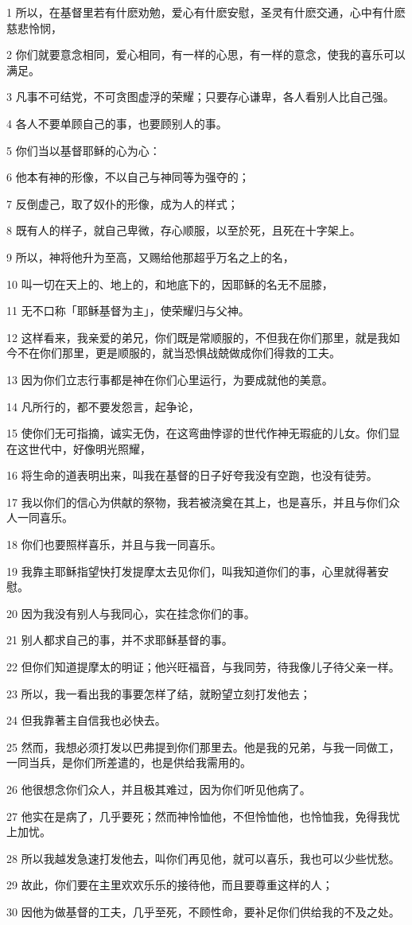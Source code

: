 \par 1 所以，在基督里若有什麽劝勉，爱心有什麽安慰，圣灵有什麽交通，心中有什麽慈悲怜悯，
\par 2 你们就要意念相同，爱心相同，有一样的心思，有一样的意念，使我的喜乐可以满足。
\par 3 凡事不可结党，不可贪图虚浮的荣耀；只要存心谦卑，各人看别人比自己强。
\par 4 各人不要单顾自己的事，也要顾别人的事。
\par 5 你们当以基督耶稣的心为心：
\par 6 他本有神的形像，不以自己与神同等为强夺的；
\par 7 反倒虚己，取了奴仆的形像，成为人的样式；
\par 8 既有人的样子，就自己卑微，存心顺服，以至於死，且死在十字架上。
\par 9 所以，神将他升为至高，又赐给他那超乎万名之上的名，
\par 10 叫一切在天上的、地上的，和地底下的，因耶稣的名无不屈膝，
\par 11 无不口称「耶稣基督为主」，使荣耀归与父神。
\par 12 这样看来，我亲爱的弟兄，你们既是常顺服的，不但我在你们那里，就是我如今不在你们那里，更是顺服的，就当恐惧战兢做成你们得救的工夫。
\par 13 因为你们立志行事都是神在你们心里运行，为要成就他的美意。
\par 14 凡所行的，都不要发怨言，起争论，
\par 15 使你们无可指摘，诚实无伪，在这弯曲悖谬的世代作神无瑕疵的儿女。你们显在这世代中，好像明光照耀，
\par 16 将生命的道表明出来，叫我在基督的日子好夸我没有空跑，也没有徒劳。
\par 17 我以你们的信心为供献的祭物，我若被浇奠在其上，也是喜乐，并且与你们众人一同喜乐。
\par 18 你们也要照样喜乐，并且与我一同喜乐。
\par 19 我靠主耶稣指望快打发提摩太去见你们，叫我知道你们的事，心里就得著安慰。
\par 20 因为我没有别人与我同心，实在挂念你们的事。
\par 21 别人都求自己的事，并不求耶稣基督的事。
\par 22 但你们知道提摩太的明证；他兴旺福音，与我同劳，待我像儿子待父亲一样。
\par 23 所以，我一看出我的事要怎样了结，就盼望立刻打发他去；
\par 24 但我靠著主自信我也必快去。
\par 25 然而，我想必须打发以巴弗提到你们那里去。他是我的兄弟，与我一同做工，一同当兵，是你们所差遣的，也是供给我需用的。
\par 26 他很想念你们众人，并且极其难过，因为你们听见他病了。
\par 27 他实在是病了，几乎要死；然而神怜恤他，不但怜恤他，也怜恤我，免得我忧上加忧。
\par 28 所以我越发急速打发他去，叫你们再见他，就可以喜乐，我也可以少些忧愁。
\par 29 故此，你们要在主里欢欢乐乐的接待他，而且要尊重这样的人；
\par 30 因他为做基督的工夫，几乎至死，不顾性命，要补足你们供给我的不及之处。

